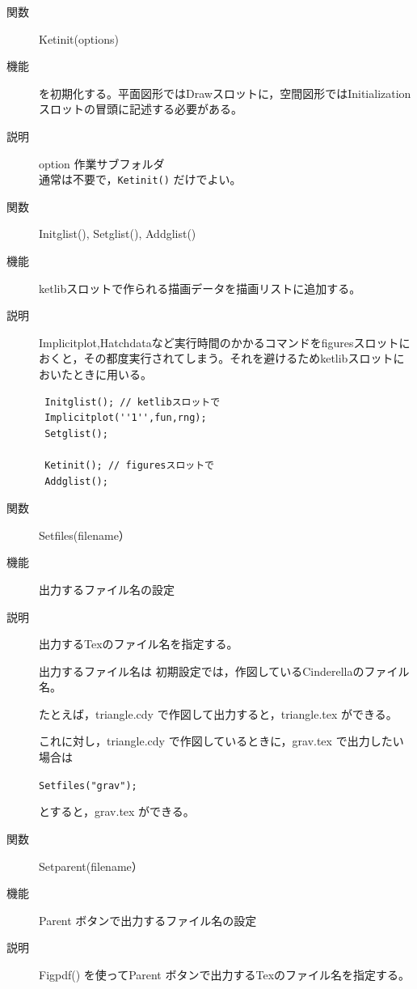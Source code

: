 \documentclass[papersize,a4paper,12pt,uplatex]{jsarticle}
\begin{document}
\begin{description}

\vspace{\baselineskip}
\hypertarget{ketinit}{}
\item[関数]Ketinit(options)
\item[機能]\ketcindy を初期化する。平面図形ではDrawスロットに，空間図形ではInitialization スロットの冒頭に記述する必要がある。
\item[説明]option 作業サブフォルダ\\%
\phantom{option }通常は不要で，\verb|Ketinit()| だけでよい。

\vspace{\baselineskip}
\hypertarget{Initglist}{}
\item[関数]Initglist(), Setglist(), Addglist()
\item[機能]ketlibスロットで作られる描画データを描画リストに追加する。
\item[説明]Implicitplot,Hatchdataなど実行時間のかかるコマンドをfiguresスロットにおくと，その都度実行されてしまう。それを避けるためketlibスロットにおいたときに用いる。

\begin{verbatim}
 Initglist(); // ketlibスロットで
 Implicitplot(''1'',fun,rng);
 Setglist();

 Ketinit(); // figuresスロットで
 Addglist();
\end{verbatim}

\vspace{\baselineskip}
\hypertarget{setfiles}{}
\item[関数]Setfiles(filename）
\item[機能]出力するファイル名の設定
\item[説明]出力するTexのファイル名を指定する。

出力するファイル名は 初期設定では，作図しているCinderellaのファイル名。

たとえば，triangle.cdy で作図して出力すると，triangle.tex ができる。

これに対し，triangle.cdy で作図しているときに，grav.tex で出力したい場合は

\hspace{10mm}\verb|Setfiles("grav");|

とすると，grav.tex ができる。

\vspace{\baselineskip}
\hypertarget{setparent}{}
\item[関数]Setparent(filename）
\item[機能]Parent ボタンで出力するファイル名の設定
\item[説明]Figpdf() を使ってParent ボタンで出力するTexのファイル名を指定する。


\end{description}
\end{document}
